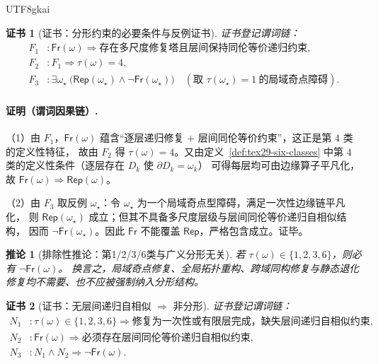 \documentclass[12pt]{article}
\newtheorem{corollary}{推论}[section]
\newtheorem{Certificate}{证书}[section]
\begin{document}
\begin{CJK*}{UTF8}{gkai}
\begin{Certificate}[证书：分形约束的必要条件与反例证书]
\label{cert:tex29-fractal-strict-subset}
证书登记谓词链：
\[
\begin{aligned}
  F_1 &: \mathsf{Fr}(\omega)\Rightarrow \text{存在多尺度修复塔且层间保持同伦等价递归约束},\\
  F_2 &: F_1 \Rightarrow \tau(\omega)=4,\\
  F_3 &: \exists \omega_\star\ \bigl(\mathsf{Rep}(\omega_\star)\wedge \neg \mathsf{Fr}(\omega_\star)\bigr)\quad(\text{取 }
    \tau(\omega_\star)=1\ \text{的局域奇点障碍}).
\end{aligned}
\]
\end{Certificate}

\paragraph{证明（谓词因果链）.}
（1）由 $F_1$，$\mathsf{Fr}(\omega)$ 蕴含“逐层递归修复 + 层间同伦等价约束”，这正是第 $4$ 类的定义性特征，
故由 $F_2$ 得 $\tau(\omega)=4$。又由定义~\ref{def:tex29-six-classes} 中第 $4$ 类的定义性条件（逐层存在 $D_k$ 使 $\partial D_k=\omega_k$）
  可得每层均可由边缘算子平凡化，故 $\mathsf{Fr}(\omega)\Rightarrow \mathsf{Rep}(\omega)$。

（2）由 $F_3$ 取反例 $\omega_\star$：令 $\omega_\star$ 为一个局域奇点型障碍，满足一次性边缘链平凡化，
则 $\mathsf{Rep}(\omega_\star)$ 成立；但其不具备多尺度层级与层间同伦等价递归自相似结构，
因而 $\neg\mathsf{Fr}(\omega_\star)$。因此 $\mathsf{Fr}$ 不能覆盖 $\mathsf{Rep}$，严格包含成立。证毕。

\begin{corollary}[排除性推论：第1/2/3/6类与广义分形无关]
\label{cor:tex29-non-fractal-classes}
若 $\tau(\omega)\in\{1,2,3,6\}$，则必有 $\neg\mathsf{Fr}(\omega)$。
换言之，局域奇点修复、全局拓扑重构、跨域同构修复与静态退化修复均不需要、也不应被强制纳入分形结构。
\end{corollary}

\begin{Certificate}[证书：无层间递归自相似 $\Rightarrow$ 非分形]
\label{cert:tex29-non-fractal-classes}
证书登记谓词链：
\[
\begin{aligned}
  N_1 &: \tau(\omega)\in\{1,2,3,6\}\Rightarrow \text{修复为一次性或有限层完成，缺失层间递归自相似约束},\\
  N_2 &: \mathsf{Fr}(\omega)\Rightarrow \text{必须存在层间同伦等价递归自相似约束},\\
  N_3 &: N_1\wedge N_2\Rightarrow \neg\mathsf{Fr}(\omega).
\end{aligned}
\]
\end{Certificate}


\end{CJK*}
\end{document}
